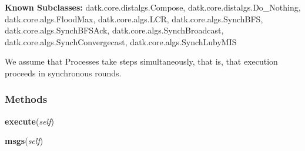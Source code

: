 \textbf{Known Subclasses:}
datk.core.distalgs.Compose,
    datk.core.distalgs.Do\_Nothing,
    datk.core.algs.FloodMax,
    datk.core.algs.LCR,
    datk.core.algs.SynchBFS,
    datk.core.algs.SynchBFSAck,
    datk.core.algs.SynchBroadcast,
    datk.core.algs.SynchConvergecast,
    datk.core.algs.SynchLubyMIS

We assume that Processes take steps simultaneously, that is, that execution
proceeds in synchronous rounds.



  \subsubsection{Methods}

    \label{datk:core:distalgs:Synchronous_Algorithm:execute}

    \vspace{0.5ex}

\hspace{.8\funcindent}\begin{boxedminipage}{\funcwidth}

    \raggedright \textbf{execute}(\textit{self})

\setlength{\parskip}{2ex}
\setlength{\parskip}{1ex}
    \end{boxedminipage}

    \label{datk:core:distalgs:Synchronous_Algorithm:msgs}

    \vspace{0.5ex}

\hspace{.8\funcindent}\begin{boxedminipage}{\funcwidth}

    \raggedright \textbf{msgs}(\textit{self})

\setlength{\parskip}{2ex}
\setlength{\parskip}{1ex}
    \end{boxedminipage}

